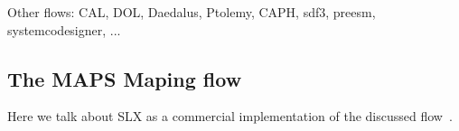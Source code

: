 Other flows: CAL, DOL, Daedalus, Ptolemy, CAPH, sdf3, preesm, systemcodesigner, ...

\subsection{The \ac{MAPS} Maping flow}
Here we talk about SLX as a commercial implementation of the discussed flow~\cite{maps}.